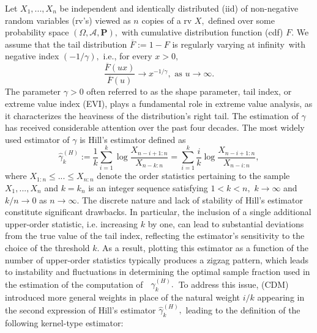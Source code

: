\documentclass[12pt,reqno,openbib,runningheads,a4paper,portrait]{amsart}%
\begin{document}
\noindent Let $X_{1},...,X_{n}$ be independent and identically distributed
(iid) of non-negative random variables (rv's) viewed as $n$ copies of a rv
$X,$ defined over some probability space $\left(  \Omega,\mathcal{A}%
,\mathbf{P}\right)  ,$ with cumulative distribution function (cdf) $F.$ We
assume that the tail distribution $\overline{F}:=1-F$ is regularly varying at
infinity\ with negative index $\left(  -1/\gamma\right)  ,$ i.e., for every
$x>0,$%
\begin{equation}
\frac{\overline{F}\left(  ux\right)  }{\overline{F}\left(  u\right)
}\rightarrow x^{-1/\gamma},\text{ as }u\rightarrow\infty. \label{RV}%
\end{equation}
The parameter $\gamma>0$ often referred to as the shape parameter, tail index,
or extreme value index (EVI), plays a fundamental role in extreme value
analysis, as it characterizes the heaviness of the distribution's right tail.
The estimation of $\gamma$ has received considerable attention over the past
four decades. The most widely used estimator of $\gamma$ is Hill's estimator
\citep{Hill75} defined as%
\[
\widehat{\gamma}_{k}^{\left(  H\right)  }:=\frac{1}{k}%
{\displaystyle\sum\limits_{i=1}^{k}}
\log\frac{X_{n-i+1:n}}{X_{n-k:n}}=%
{\displaystyle\sum\limits_{i=1}^{k}}
\frac{i}{k}\log\frac{X_{n-i+1:n}}{X_{n-i:n}},
\]
where $X_{1:n}\leq...\leq X_{n:n}$ denote the order statistics pertaining to
the sample $X_{1},...,X_{n}$ and $k=k_{n}$ is an integer sequence satisfying
$1<k<n,$ $k\rightarrow\infty$ and $k/n\rightarrow0$ as $n\rightarrow\infty.$
The discrete nature and lack of stability of Hill's estimator constitute
significant drawbacks. In particular, the inclusion of a single additional
upper-order statistic, i.e. increasing $k$ by one, can lead to substantial
deviations from the true value of the tail index, reflecting the estimator's
sensitivity to the choice of the threshold $k.$ As a result, plotting this
estimator as a function of the number of upper-order statistics typically
produces a zigzag pattern, which leads to instability and fluctuations in
determining the optimal sample fraction used in the estimation of the
computation of \textbf{\ }$\widehat{\gamma}_{k}^{\left(  H\right)  }%
\mathbf{.}$\textbf{\ }To address this issue, \cite{CDM85} (CDM) introduced
more general weights in place of the natural weight $i/k$ appearing in the
second expression of Hill's estimator $\widehat{\gamma}_{k}^{\left(  H\right)
},$ leading to the definition of the following kernel-type estimator:
\end{document}
